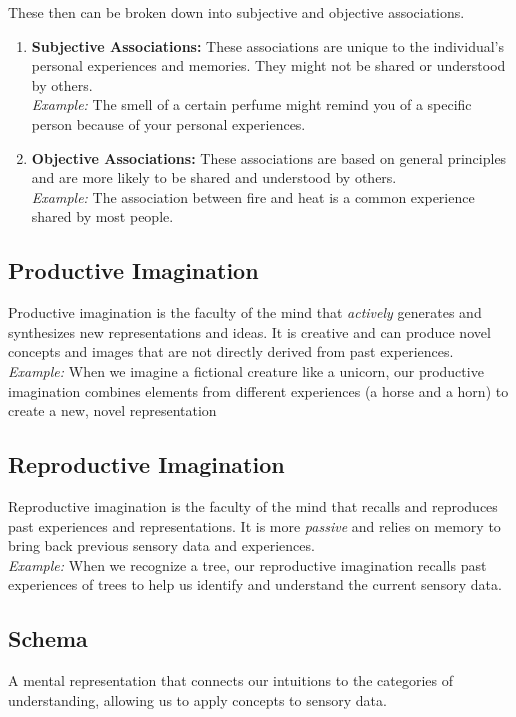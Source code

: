 \documentclass[a4paper]{article}
\begin{document}
These then can be broken down into subjective and objective associations.

\begin{enumerate}
    \item \textbf{Subjective Associations:}
    These associations are unique to the individual's personal experiences and memories. They might not be shared or understood by others. \\
    \textit{Example:} The smell of a certain perfume might remind you of a specific person because of your personal experiences.
    \item \textbf{Objective Associations:}
    These associations are based on general principles and are more likely to be shared and understood by others. \\
    \textit{Example:} The association between fire and heat is a common experience shared by most people.
\end{enumerate}

\subsection{Productive Imagination}
Productive imagination is the faculty of the mind that \textit{actively} generates and synthesizes new representations and ideas. 
It is creative and can produce novel concepts and images that are not directly derived from past experiences. \\

\textit{Example:} When we imagine a fictional creature like a unicorn, our productive imagination combines elements from different experiences (a horse and a horn) to create a new, novel representation

\subsection{Reproductive Imagination}
Reproductive imagination is the faculty of the mind that recalls and reproduces past experiences and representations. 
It is more \textit{passive} and relies on memory to bring back previous sensory data and experiences. \\

\textit{Example:} When we recognize a tree, our reproductive imagination recalls past experiences of trees to help us identify and understand the current sensory data.

\subsection{Schema}
A mental representation that connects our intuitions to the categories of understanding, allowing us to apply concepts to sensory data.
\end{document}
